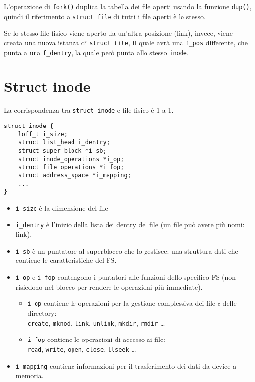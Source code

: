 \documentclass[12pt, a4paper]{report}
\begin{document}
L'operazione di \texttt{fork()} duplica la tabella dei file aperti usando la
funzione \texttt{dup()}, quindi il riferimento a \texttt{struct
file} di tutti i file aperti è lo stesso.

Se lo stesso file fisico viene aperto da un'altra posizione (link), invece,
viene creata una nuova istanza di \texttt{struct file}, il quale avrà una
\texttt{f\_pos} differente, che punta a una \texttt{f\_dentry}, la quale però
punta  allo stesso \texttt{inode}.

\section{Struct inode}
La corrispondenza tra \texttt{struct inode} e file fisico è 1 a 1.
\begin{verbatim}
struct inode {
	loff_t i_size;
    struct list_head i_dentry;
    struct super_block *i_sb;
    struct inode_operations *i_op;
    struct file_operations *i_fop;
    struct address_space *i_mapping;
    ...
}
\end{verbatim}
\begin{itemize}
	\item \texttt{i\_size} è la dimensione del file.
	\item \texttt{i\_dentry} è l'inizio della lista dei dentry del file (un file
		può avere più nomi: link).
	\item \texttt{i\_sb} è un puntatore al superblocco che lo gestisce: una
		struttura dati che contiene le caratteristiche del FS.
	\item \texttt{i\_op} e \texttt{i\_fop} contengono i puntatori alle funzioni
		dello specifico FS (non risiedono nel blocco per rendere le operazioni
		più immediate).
		\begin{itemize}
			\item \texttt{i\_op} contiene le operazioni per la gestione
				complessiva dei file e delle directory:\\
				\texttt{create}, \texttt{mknod}, \texttt{link}, \texttt{unlink},
				\texttt{mkdir}, \texttt{rmdir} \dots
			\item \texttt{i\_fop} contiene le operazioni di accesso ai file:\\
				\texttt{read}, \texttt{write}, \texttt{open}, \texttt{close},
				\texttt{llseek} \dots
		\end{itemize}
	\item \texttt{i\_mapping} contiene informazioni per il trasferimento dei
		dati da device a memoria.
\end{itemize}
\end{document}
